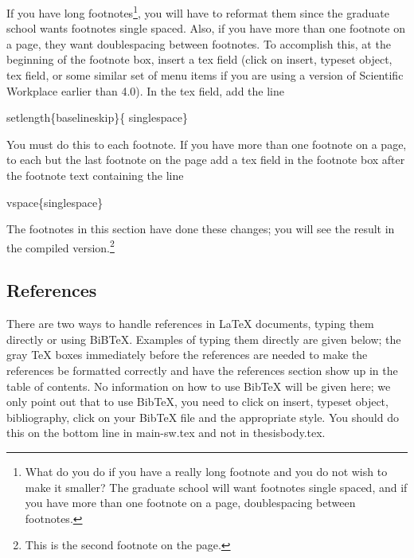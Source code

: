 If you have long footnotes\footnote{%
\setlength{\baselineskip}{\singlespace}%
What do you do if you have a really long footnote and you do not wish to
make it smaller? The graduate school will want footnotes single spaced, and
if you have more than one footnote on a page, doublespacing between
footnotes.%
\vspace{\singlespace}%
}, you will have to reformat them since the graduate school wants footnotes
single spaced. Also, if you have more than one footnote on a page, they want
doublespacing between footnotes. To accomplish this, at the beginning of the
footnote box, insert a tex field (click on insert, typeset object, tex
field, or some similar set of menu items if you are using a version of
Scientific Workplace earlier than 4.0). In the tex field, add the line

\begin{center}
\TEXTsymbol{\backslash}setlength\{\TEXTsymbol{\backslash}baselineskip\}\{%
\TEXTsymbol{\backslash}singlespace\}
\end{center}

\noindent You must do this to each footnote. If you have more than one
footnote on a page, to each but the last footnote on the page add a tex
field in the footnote box after the footnote text containing the line

\begin{center}
\TEXTsymbol{\backslash}vspace\{\TEXTsymbol{\backslash}singlespace\}
\end{center}

\noindent The footnotes in this section have done these changes; you will
see the result in the compiled version.\footnote{%
\setlength{\baselineskip}{\singlespace}%
This is the second footnote on the page.}

\subsection{References}

There are two ways to handle references in LaTeX documents, typing them
directly or using BiBTeX. Examples of typing them directly are given below;
the gray TeX boxes immediately before the references are needed to make the
references be formatted correctly and have the references section show up in
the table of contents. No information on how to use BibTeX will be given
here; we only point out that to use BibTeX, you need to click on insert,
typeset object, bibliography, click on your BibTeX file and the appropriate
style. You should do this on the bottom line in main-sw.tex and not in
thesisbody.tex.

